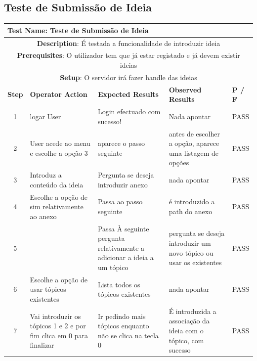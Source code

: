 \documentclass[12pt]{article} %
\begin{document}
\subsection{Teste de Submissão de Ideia}
\begin{table}[ht!]
	\begin{tabular}{|c|p{4cm}|p{4cm}|p{3cm}|p{1cm}|}
		\hline
		\multicolumn{5}{|l|}{\textbf{Test Name}: Teste de Submissão de Ideia}\\
		\hline
		\multicolumn{5}{|p{14,5cm}|}{\textbf{Description}: É testada a funcionalidade de introduzir ideia}\\
		\hline
		\multicolumn{5}{|p{14,5cm}|}{\textbf{Prerequisites}: O utilizador tem que já estar registado e já devem existir ideias}\\
		\hline
		\multicolumn{5}{|p{14,5cm}|}{\textbf{Setup}: O servidor irá fazer handle das ideias}\\
		\hline
		\textbf{Step} & \textbf{Operator Action} & \textbf{Expected Results} & \textbf{Observed Results} & \textbf{P / F}\\
		\hline
		1 & logar User & Login efectuado com sucesso! & Nada apontar & PASS\\
		\hline
		2 & User acede ao menu e escolhe a opção 3 & aparece o passo seguinte & antes de escolher a opção, aparece uma listagem de opções & PASS\\
		\hline
		3 & Introduz a conteúdo da ideia & Pergunta se deseja introduzir anexo & nada apontar & PASS\\
		\hline
		4 & Escolhe a opção de sim relativamente ao anexo & Passa ao passo seguinte & é introduzido a path do anexo & PASS\\
		\hline
		5 & --- & Passa À seguinte pergunta relativamente a adicionar a ideia a um tópico & pergunta se deseja introduzir um novo tópico ou usar os existentes & PASS\\
		\hline
		6 & Escolhe a opção de usar tópicos existentes & Lista todos os tópicos existentes & nada apontar & PASS\\
		\hline
		7 & Vai introduzir os tópicos 1 e 2 e por fim clica em 0 para finalizar & Ir pedindo mais tópicos enquanto não se clica na tecla 0 & É introduzida a associação da ideia com o tópico, com sucesso & PASS\\
		\hline
	\end{tabular}
\end{table}
\pagebreak
\end{document}
